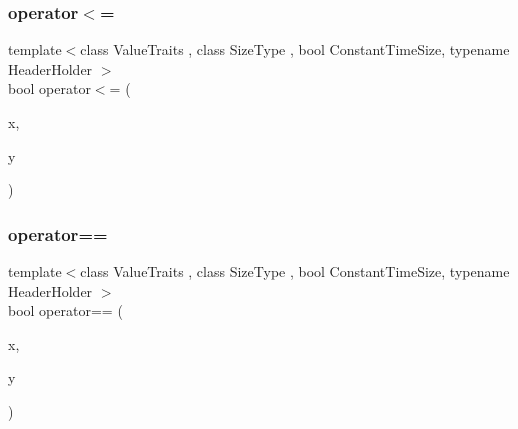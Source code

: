 \subsubsection{\texorpdfstring{operator$<$=}{operator<=}}
{\footnotesize\ttfamily template$<$class Value\+Traits , class Size\+Type , bool Constant\+Time\+Size, typename Header\+Holder $>$ \\
bool operator$<$= (\begin{DoxyParamCaption}\item[{const \hyperlink{classboost_1_1intrusive_1_1list__impl}{list\+\_\+impl}$<$ Value\+Traits, Size\+Type, Constant\+Time\+Size, Header\+Holder $>$ \&}]{x,  }\item[{const \hyperlink{classboost_1_1intrusive_1_1list__impl}{list\+\_\+impl}$<$ Value\+Traits, Size\+Type, Constant\+Time\+Size, Header\+Holder $>$ \&}]{y }\end{DoxyParamCaption})\hspace{0.3cm}{\ttfamily [friend]}}

\mbox{\label{classboost_1_1intrusive_1_1list__impl_adfa112438fc1b811ec128a07af699c94}} 
\subsubsection{\texorpdfstring{operator==}{operator==}}
{\footnotesize\ttfamily template$<$class Value\+Traits , class Size\+Type , bool Constant\+Time\+Size, typename Header\+Holder $>$ \\
bool operator== (\begin{DoxyParamCaption}\item[{const \hyperlink{classboost_1_1intrusive_1_1list__impl}{list\+\_\+impl}$<$ Value\+Traits, Size\+Type, Constant\+Time\+Size, Header\+Holder $>$ \&}]{x,  }\item[{const \hyperlink{classboost_1_1intrusive_1_1list__impl}{list\+\_\+impl}$<$ Value\+Traits, Size\+Type, Constant\+Time\+Size, Header\+Holder $>$ \&}]{y }\end{DoxyParamCaption})\hspace{0.3cm}{\ttfamily [friend]}}

\mbox{\label{classboost_1_1intrusive_1_1list__impl_aa53995779f3115d3d6283176ae2e5879}} 
